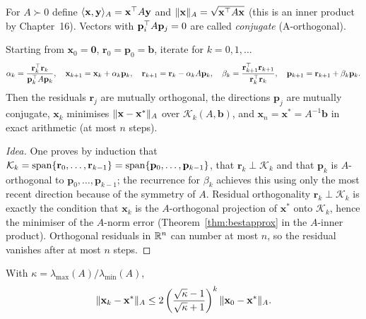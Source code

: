 \begin{definition}
For $A\succ0$ define $\langle \mathbf{x},\mathbf{y}\rangle_A=\mathbf{x}^{\top} A\mathbf{y}$ and $\lVert\mathbf{x}\rVert_A=\sqrt{\mathbf{x}^{\top} A\mathbf{x}}$ (this is an inner product by Chapter~16). Vectors with $\mathbf{p}_i^{\top} A\mathbf{p}_j=0$ are called \emph{conjugate} (A-orthogonal).
\end{definition}

\begin{theorem}\label{thm:cg}
Starting from $\mathbf{x}_0=\mathbf{0}$, $\mathbf{r}_0=\mathbf{p}_0=\mathbf{b}$, iterate for $k=0,1,\dots$
\[ \alpha_k=\frac{\mathbf{r}_k^{\top}\mathbf{r}_k}{\mathbf{p}_k^{\top} A\mathbf{p}_k},\quad\mathbf{x}_{k+1}=\mathbf{x}_k+\alpha_k\mathbf{p}_k,\quad\mathbf{r}_{k+1}=\mathbf{r}_k-\alpha_kA\mathbf{p}_k,\quad\beta_k=\frac{\mathbf{r}_{k+1}^{\top}\mathbf{r}_{k+1}}{\mathbf{r}_k^{\top}\mathbf{r}_k},\quad\mathbf{p}_{k+1}=\mathbf{r}_{k+1}+\beta_k\mathbf{p}_k. \]
Then the residuals $\mathbf{r}_j$ are mutually orthogonal, the directions $\mathbf{p}_j$ are mutually conjugate, $\mathbf{x}_k$ minimises $\lVert\mathbf{x}-\mathbf{x}^*\rVert_A$ over $\mathcal{K}_k(A,\mathbf{b})$, and $\mathbf{x}_n=\mathbf{x}^*=A^{-1}\mathbf{b}$ in exact arithmetic (at most $n$ steps).
\end{theorem}

\begin{proof}[Idea]
One proves by induction that $\mathcal{K}_k=\operatorname{span}\{\mathbf{r}_0,\dots,\mathbf{r}_{k-1}\}=\operatorname{span}\{\mathbf{p}_0,\dots,\mathbf{p}_{k-1}\}$, that $\mathbf{r}_k\perp\mathcal{K}_k$ and that $\mathbf{p}_k$ is $A$-orthogonal to $\mathbf{p}_0,\dots,\mathbf{p}_{k-1}$; the recurrence for $\beta_k$ achieves this using only the most recent direction because of the symmetry of $A$. Residual orthogonality $\mathbf{r}_k\perp\mathcal{K}_k$ is exactly the condition that $\mathbf{x}_k$ is the $A$-orthogonal projection of $\mathbf{x}^*$ onto $\mathcal{K}_k$, hence the minimiser of the $A$-norm error (Theorem~\ref{thm:bestapprox} in the $A$-inner product). Orthogonal residuals in $\mathbb{R}^n$ can number at most $n$, so the residual vanishes after at most $n$ steps.
\end{proof}

\begin{theorem}\label{thm:cgrate}
With $\kappa=\lambda_{\max}(A)/\lambda_{\min}(A)$,
\[ \lVert\mathbf{x}_k-\mathbf{x}^*\rVert_A\le2\left(\frac{\sqrt\kappa-1}{\sqrt\kappa+1}\right)^k\lVert\mathbf{x}_0-\mathbf{x}^*\rVert_A. \]
\end{theorem}

